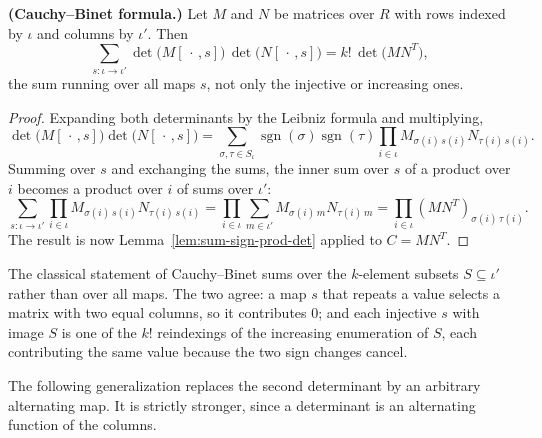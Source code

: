 \begin{proposition}
\label{lem:cauchy-binet}
\leanok
{}
\textbf{(Cauchy--Binet formula.)} Let $M$ and $N$ be matrices over $R$ with rows indexed by $\iota$ and columns by $\iota'$. Then
\[
\sum_{s \colon \iota \to \iota'} \det\big(M[\,\cdot\,, s]\big)\,\det\big(N[\,\cdot\,, s]\big) = k!\,\det\big(MN^{T}\big),
\]
the sum running over all maps $s$, not only the injective or increasing ones.
\end{proposition}
\begin{proof}
\leanok
{}
Expanding both determinants by the Leibniz formula and multiplying,
\[
\det\big(M[\,\cdot\,, s]\big)\det\big(N[\,\cdot\,, s]\big) = \sum_{\sigma, \tau \in S_\iota} \operatorname{sgn}(\sigma)\operatorname{sgn}(\tau) \prod_{i \in \iota} M_{\sigma(i)\,s(i)} N_{\tau(i)\,s(i)} .
\]
Summing over $s$ and exchanging the sums, the inner sum over $s$ of a product over $i$ becomes a product over $i$ of sums over $\iota'$:
\[
\sum_{s \colon \iota \to \iota'} \prod_{i \in \iota} M_{\sigma(i)\,s(i)} N_{\tau(i)\,s(i)} = \prod_{i \in \iota} \sum_{m \in \iota'} M_{\sigma(i)\,m} N_{\tau(i)\,m} = \prod_{i \in \iota} (MN^{T})_{\sigma(i)\,\tau(i)} .
\]
The result is now Lemma~\ref{lem:sum-sign-prod-det} applied to $C = MN^{T}$.
\end{proof}

The classical statement of Cauchy--Binet sums over the $k$-element subsets $S \subseteq \iota'$ rather than over all maps. The two agree: a map $s$ that repeats a value selects a matrix with two equal columns, so it contributes $0$; and each injective $s$ with image $S$ is one of the $k!$ reindexings of the increasing enumeration of $S$, each contributing the same value because the two sign changes cancel.

The following generalization replaces the second determinant by an arbitrary alternating map. It is strictly stronger, since a determinant is an alternating function of the columns.

